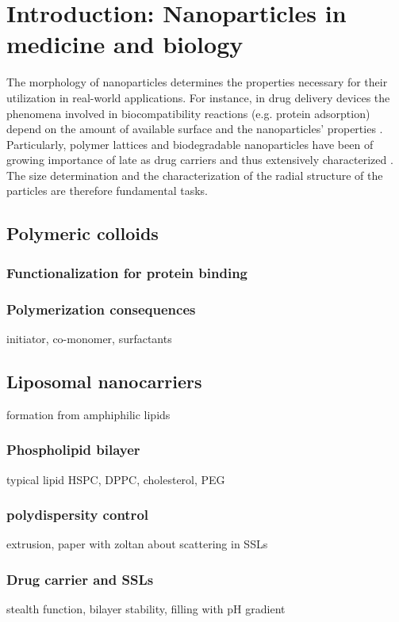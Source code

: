 \chapter{Introduction: Nanoparticles in medicine and biology}
The morphology of nanoparticles determines the properties necessary for their utilization in real-world applications. For instance, in drug delivery devices the phenomena involved in biocompatibility reactions (e.g. protein adsorption) depend on the amount of available surface and the nanoparticles' properties \citet{vittaz_effect_1996}. Particularly, polymer lattices and biodegradable nanoparticles have been of growing importance of late as drug carriers \citet{kattan_phase_1992} and thus extensively characterized \citet{soppimath_biodegradable_2001}. The size determination and the characterization of the radial structure of the particles are therefore fundamental tasks. 
\label{chap:introduction}

\section{Polymeric colloids}
\subsection{Functionalization for protein binding}

\subsection{Polymerization consequences}
initiator, co-monomer, surfactants

\section{Liposomal nanocarriers}
formation from amphiphilic lipids
\subsection{Phospholipid bilayer}
typical lipid HSPC, DPPC, cholesterol, PEG

\subsection{polydispersity control}
extrusion, paper with zoltan about scattering in SSLs

\subsection{Drug carrier and SSLs}
stealth function, bilayer stability, filling with pH gradient

